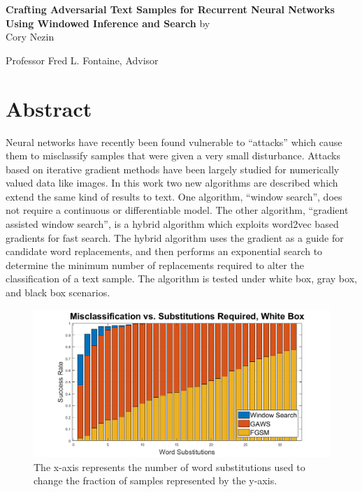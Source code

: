 \documentclass[12pt,oneside]{article}
\begin{document}
{
\centering
\Large
{
\textbf{
Crafting Adversarial Text Samples for Recurrent Neural Networks Using Windowed Inference and Search}
}
\vskip 9pt
by\\
Cory Nezin

\vskip 9pt
Professor Fred L. Fontaine, Advisor
{
\centering
\section*{Abstract}
}
}
\noindent
Neural networks have recently been found vulnerable to ``attacks'' which cause them to misclassify samples that were given a very small disturbance.  Attacks based on iterative gradient methods have been largely studied for numerically valued data like images.  In this work two new algorithms are described which extend the same kind of results to text.  One algorithm, ``window search'', does not require a continuous or differentiable model.  The other algorithm, ``gradient assisted window search'', is a hybrid algorithm which exploits word2vec based gradients for fast search.  The hybrid algorithm uses the gradient as a guide for candidate word replacements, and then performs an exponential search to determine the minimum number of replacements required to alter the classification of a text sample.  The algorithm is tested under white box, gray box, and black box scenarios.
\begin{figure}[h]
    \centering
    \includegraphics[width=\textwidth]{images/cdf_white.png}
    \caption{The x-axis represents the number of word substitutions used to change the fraction of samples represented by the y-axis.}
    \label{fig:whitepmf}
\end{figure}
\end{document}

